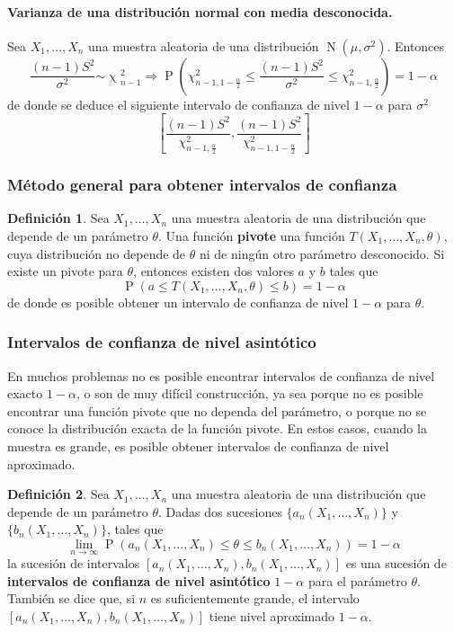 \documentclass[11pt]{article}
\theoremstyle{plain}
\theoremstyle{definition}
\newtheorem*{defi}{Definición}
\theoremstyle{remark}
\newcommand{\deft}[1]{\textbf{#1}}  %
\newcommand{\proba}{\ensuremath{\operatorname{P}}}  %
\newcommand{\dists}[1]{\ensuremath{\operatorname{#1}}}  %
\newcommand{\dist}[1]{\ensuremath{\sim \operatorname{#1}}}  %
\begin{document}
      \paragraph{Varianza de una distribución normal con media desconocida.} Sea $X_1, \dots, X_n$ una muestra aleatoria de una distribución $\dists{N}(\mu,\sigma^2)$. Entonces
      \[ \frac{(n - 1) S^2}{\sigma^2} \dist{\chi}_{n-1}^2 \Rightarrow \proba\left( \chi^2_{n - 1, 1 - \frac{\alpha}{2}} \leq \frac{(n - 1) S^2}{\sigma^2} \leq \chi^2_{n - 1, \frac{\alpha}{2}} \right) = 1 - \alpha \]
      de donde se deduce el siguiente intervalo de confianza de nivel $1 - \alpha$ para $\sigma^2$
      \[ \left[ \frac{(n-1) S^2}{\chi^2_{n - 1, \frac{\alpha}{2}}} , \frac{(n-1) S^2}{\chi^2_{n - 1, 1 - \frac{\alpha}{2}}} \right] \]

    \subsubsection{Método general para obtener intervalos de confianza}

      \begin{defi}
        Sea $X_1, \dots, X_n$ una muestra aleatoria de una distribución que depende de un parámetro $\theta$. Una función \deft{pivote} una función $T(X_1,\dots,X_n,\theta)$, cuya distribución no depende de $\theta$ ni de ningún otro parámetro desconocido. Si existe un pivote para $\theta$, entonces existen dos valores $a$ y $b$ tales que
        \[ \proba(a \leq T(X_1,\dots,X_n,\theta) \leq b) = 1 - \alpha \]
        de donde es posible obtener un intervalo de confianza de nivel $1 - \alpha$ para $\theta$.
      \end{defi}

    \subsubsection{Intervalos de confianza de nivel asintótico}

      En muchos problemas no es posible encontrar intervalos de confianza de nivel exacto $1 - \alpha$, o son de muy difícil construcción, ya sea porque no es posible encontrar una función pivote que no dependa del parámetro, o porque no se conoce la distribución exacta de la función pivote. En estos casos, cuando la muestra es grande, es posible obtener intervalos de confianza de nivel aproximado.

      \begin{defi}
        Sea $X_1, \dots, X_n$ una muestra aleatoria de una distribución que depende de un parámetro $\theta$. Dadas dos sucesiones $\lbrace a_n(X_1,\dots,X_n) \rbrace$ y $\lbrace b_n(X_1,\dots,X_n) \rbrace$, tales que
        \[ \lim_{n \to \infty} \proba(a_n(X_1,\dots,X_n) \leq \theta \leq b_n(X_1,\dots,X_n)) = 1 - \alpha \]
        la sucesión de intervalos $[a_n(X_1,\dots,X_n), b_n(X_1,\dots,X_n)]$ es una sucesión de \deft{intervalos de confianza de nivel asintótico} $1 - \alpha$ para el parámetro $\theta$. También se dice que, si $n$ es suficientemente grande, el intervalo $[a_n(X_1,\dots,X_n), b_n(X_1,\dots,X_n)]$ tiene nivel aproximado $1 - \alpha$.
      \end{defi}
\end{document}
